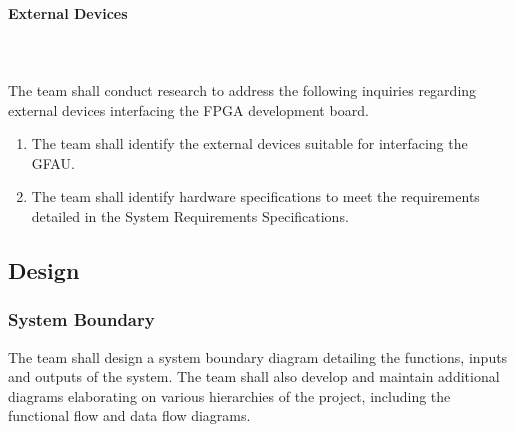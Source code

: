 \documentclass[12pt]{extarticle}
\begin{document}

                \paragraph{External Devices} \leavevmode \\~\\ The team shall
                conduct research to address the following inquiries regarding
                external devices interfacing the FPGA development board.

                \begin{enumerate}
                    \item The team shall identify the external devices suitable
                    for interfacing the GFAU.
                    \item The team shall identify hardware specifications to
                    meet the requirements detailed in the System Requirements
                    Specifications.
                \end{enumerate}


        \subsection{Design}

            \subsubsection{System Boundary} The team shall design a system
            boundary diagram detailing the functions, inputs and outputs of the
            system. The team shall also develop and maintain additional
            diagrams elaborating on various hierarchies of the project,
            including the functional flow and data flow diagrams.
\end{document}
